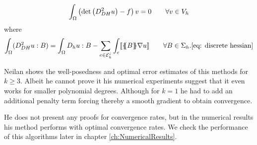 \begin{align}
		\int_\Omega \left(\det{\left(D_{DH}^2 u\right)} - f \right) v = 0 \qquad \forall v \in V_h
\end{align}
where
	\begin{align}
		\int_\Omega (D_{DH}^2 u : B) 
		= \int_\Omega D_h u: B -\sum_{ e \in \mathcal{E}_h^i} \int_e  \llbracket \{\!\!\{ B \}\!\!\} \nabla u  \rrbracket\qquad \forall B \in \Sigma_h. \eqref{eq: discrete hessian}
	\end{align}

Neilan shows the well-posedness and optimal error estimates of this methods for $k \geq 3$. Albeit he cannot prove it his numerical experiments suggest that it even works for smaller polynomial degrees. Although for $k=1$ he had to add an additional penalty term forcing thereby a smooth gradient to obtain convergence.

He does not present any proofs for convergence rates, but in the numerical results his method performs with optimal convergence rates. We check the performance of this algorithms later in chapter \ref{ch:NumericalResults}.